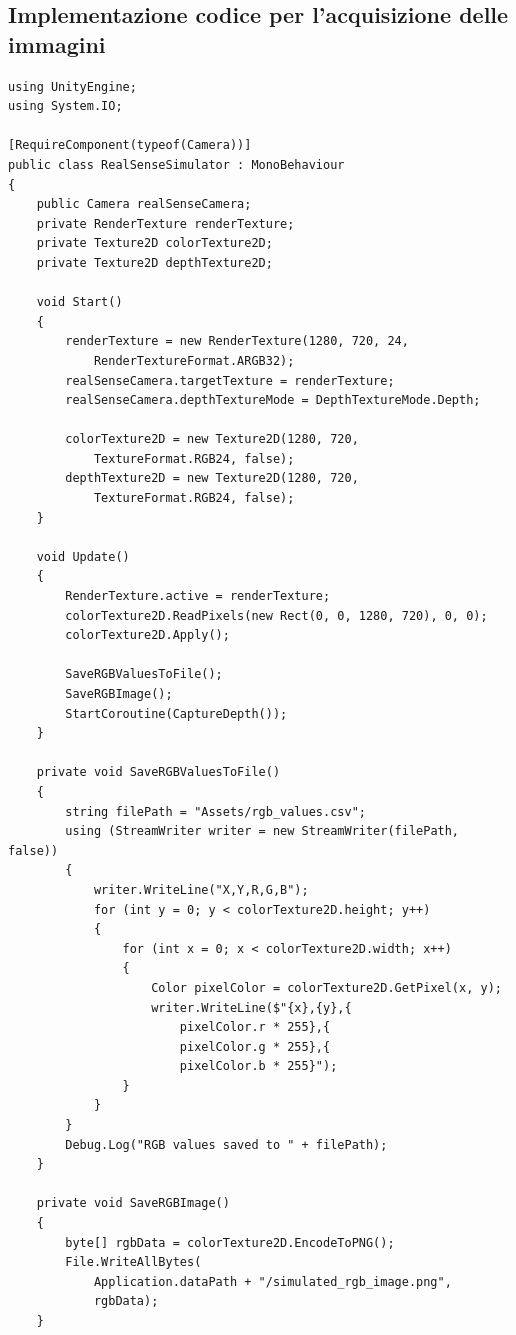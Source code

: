 \documentclass[11pt]{report}
\begin{document}
\subsection{Implementazione codice per l'acquisizione delle immagini}
\begin{lstlisting}[caption=Script base di acquisizione immagini, label=lst:base, lineskip=0.3em]
using UnityEngine;
using System.IO;

[RequireComponent(typeof(Camera))]
public class RealSenseSimulator : MonoBehaviour
{
    public Camera realSenseCamera;
    private RenderTexture renderTexture;
    private Texture2D colorTexture2D;
    private Texture2D depthTexture2D;

    void Start()
    {
        renderTexture = new RenderTexture(1280, 720, 24, 
            RenderTextureFormat.ARGB32);
        realSenseCamera.targetTexture = renderTexture;
        realSenseCamera.depthTextureMode = DepthTextureMode.Depth;
        
        colorTexture2D = new Texture2D(1280, 720, 
            TextureFormat.RGB24, false);
        depthTexture2D = new Texture2D(1280, 720, 
            TextureFormat.RGB24, false);
    }

    void Update()
    {
        RenderTexture.active = renderTexture;
        colorTexture2D.ReadPixels(new Rect(0, 0, 1280, 720), 0, 0);
        colorTexture2D.Apply();
        
        SaveRGBValuesToFile();
        SaveRGBImage();
        StartCoroutine(CaptureDepth());
    }

    private void SaveRGBValuesToFile()
    {
        string filePath = "Assets/rgb_values.csv";
        using (StreamWriter writer = new StreamWriter(filePath, false))
        {
            writer.WriteLine("X,Y,R,G,B");
            for (int y = 0; y < colorTexture2D.height; y++)
            {
                for (int x = 0; x < colorTexture2D.width; x++)
                {
                    Color pixelColor = colorTexture2D.GetPixel(x, y);
                    writer.WriteLine($"{x},{y},{
                        pixelColor.r * 255},{
                        pixelColor.g * 255},{
                        pixelColor.b * 255}");
                }
            }
        }
        Debug.Log("RGB values saved to " + filePath);
    }

    private void SaveRGBImage()
    {
        byte[] rgbData = colorTexture2D.EncodeToPNG();
        File.WriteAllBytes(
            Application.dataPath + "/simulated_rgb_image.png", 
            rgbData);
    }


\end{lstlisting}
\end{document}
